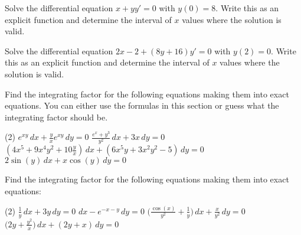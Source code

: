 \documentclass{ximera}
\begin{document}
\begin{exercise}
    Solve the differential equation $x + yy' = 0$ with $y(0) = 8$. Write this as an explicit function and determine the interval of $x$ values where the solution is valid. 
\end{exercise}

\begin{exercise}
    Solve the differential equation $2x-2 + (8y+16)y' = 0$ with $y(2) = 0$. Write this as an explicit function and determine the interval of $x$ values where the solution is valid. 
\end{exercise}

\begin{exercise}
    Find the integrating factor for the following equations making them into exact equations. You can either use the formulas in this section or guess what the integrating factor should be.
    \begin{tasks}(2)
        \task $e^{xy} \, dx + \frac{y}{x} e^{xy} \, dy = 0$
        \task $\frac{e^x+y^3}{y^2} \, dx + 3x \, dy = 0$
        \task $(4x^5 + 9x^4y^2 + 10\frac{y}{x})\, dx + (6x^5y + 3x^2y^2 - 5)\, dy = 0$
        \task $2\sin(y) \, dx + x\cos(y)\, dy = 0$
    \end{tasks}
\end{exercise}

\begin{samepage}
\begin{exercise}%
    Find the integrating factor for the following equations making them into exact equations:
    \begin{tasks}(2)
        \task $\frac{1}{y}\, dx + 3y \, dy = 0$
        \task $dx - e^{-x-y} \, dy = 0$
        \task $\bigl( \frac{\cos(x)}{y^2} + \frac{1}{y} \bigr) \, dx + \frac{x}{y^2} \, dy = 0$
        \task $\bigl( 2y + \frac{y^2}{x} \bigr) \, dx + ( 2y+x )\, dy = 0$
    \end{tasks}
\end{exercise}
\end{samepage}
\end{document}
